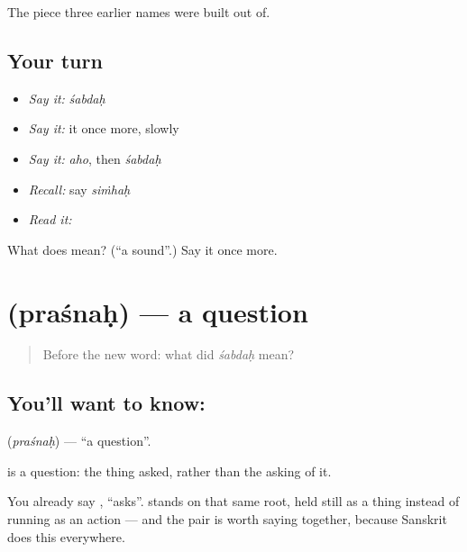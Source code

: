 \begin{grammarlens}[title={What you've built}]
The piece three earlier names were built out of.
\end{grammarlens}

\subsection*{Your turn}
\begin{itemize}
\raggedright
  \item \emph{Say it:} \emph{śabdaḥ}
  \item \emph{Say it:} it once more, slowly
  \item \emph{Say it:} \emph{aho}, then \emph{śabdaḥ}
  \item \emph{Recall:} say \emph{siṁhaḥ}
  \item \emph{Read it:} \textbf{}
\end{itemize}

\begin{tcolorbox}[breakable,colback=teal!4,colframe=teal!35!black,title={Before you move on}]
What does  mean? (\textquotedblleft{}a sound\textquotedblright{}.) Say it once more.
\end{tcolorbox}
\section[\texorpdfstring{\sk{प्रश्नः} (praśnaḥ)}{प्रश्नः (praśnaḥ)}]{ (praśnaḥ) — a question}

\label{lesson:SA-C50-question}



\begin{quote}
Before the new word: what did \emph{śabdaḥ} mean?
\end{quote}

\subsection*{You'll want to know: }
\textbf{} (\emph{praśnaḥ}) — \textquotedblleft{}a question\textquotedblright{}.

\textbf{} is a question: the thing asked, rather than the asking of it.

You already say , \textquotedblleft{}asks\textquotedblright{}. \textbf{} stands on that same root, held still as a thing instead of running as an action — and the pair is worth saying together, because Sanskrit does this everywhere.

